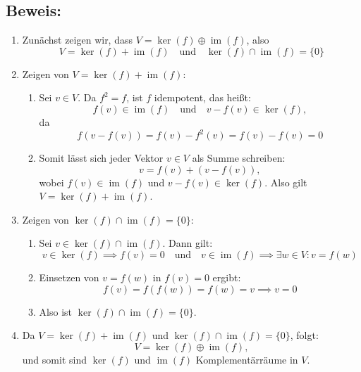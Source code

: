 \documentclass[11pt]{article}
\begin{document}
\subsection*{Beweis:}
\begin{enumerate}
    \item Zunächst zeigen wir, dass \( V = \ker(f) \oplus \operatorname{im}(f) \), also
    \[
    V = \ker(f) + \operatorname{im}(f) \quad \text{und} \quad \ker(f) \cap \operatorname{im}(f) = \{0\}
    \]

    \item Zeigen von \( V = \ker(f) + \operatorname{im}(f) \):
    \begin{enumerate}
        \item Sei \( v \in V \). Da \( f^2 = f \), ist \( f \) idempotent, das heißt:
        \[
        f(v) \in \operatorname{im}(f) \quad \text{und} \quad v - f(v) \in \ker(f),
        \]
        da
        \[
        f(v - f(v)) = f(v) - f^2(v) = f(v) - f(v) = 0
        \]
        \item Somit lässt sich jeder Vektor \( v \in V \) als Summe schreiben:
        \[
        v = f(v) + (v - f(v)),
        \]
        wobei \( f(v) \in \operatorname{im}(f) \) und \( v - f(v) \in \ker(f) \). Also gilt \( V = \ker(f) + \operatorname{im}(f) \).
    \end{enumerate}

    \item Zeigen von \( \ker(f) \cap \operatorname{im}(f) = \{0\} \):
    \begin{enumerate}
        \item Sei \( v \in \ker(f) \cap \operatorname{im}(f) \). Dann gilt:
        \[
        v \in \ker(f) \implies f(v) = 0 \quad \text{und} \quad v \in \operatorname{im}(f) \implies \exists w \in V : v = f(w)
        \]
        \item Einsetzen von \( v = f(w) \) in \( f(v) = 0 \) ergibt:
        \[
        f(v) = f(f(w)) = f(w) = v \implies v = 0
        \]
        \item Also ist \( \ker(f) \cap \operatorname{im}(f) = \{0\} \).
    \end{enumerate}

    \item Da \( V = \ker(f) + \operatorname{im}(f) \) und \( \ker(f) \cap \operatorname{im}(f) = \{0\} \), folgt:
    \[
    V = \ker(f) \oplus \operatorname{im}(f),
    \]
    und somit sind \( \ker(f) \) und \( \operatorname{im}(f) \) Komplementärräume in \( V \).
\end{enumerate}



\end{document}
